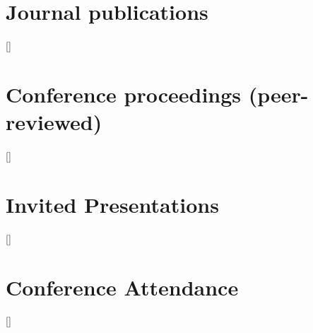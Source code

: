 

\section*{Journal publications}

\begin{refsection}
[\refname]{}
\nocite{
TeixeiraEncarnacao2016,
Bezdek2016,
Siemes2016,
VandenIJssel2015,
HashemiFarahani2013,
Olsen2013a,
Visser2013,
Ditmar2012,
Gunter2011,
Encarnacao2008a,
Resendes2007}
\togglefalse{bbx:url}
\printbibliography
\end{refsection}


\section*{Conference proceedings (peer-reviewed)}

\begin{refsection}
[\refname]{}

\nocite{
Gunter2012a,
Gunter2010,
Gunter2009,
Encarnacao2008,
Resendes2006,
Resendes2005}
\printbibliography
\end{refsection}


\section*{Invited Presentations}

\begin{refsection}
[\refname]{}
\nocite{
TeixeiraEncarnacao2015a,
Encarnacao2017}
\printbibliography
\end{refsection}


\section*{Conference Attendance}

\begin{refsection}
[\refname]{}
\nocite{
Encarnacao2002,
Encarnacao2008,
TeixeiraEncarnacao2008,
TeixeiraEncarnacao2007,
TeixeiraEncarnacao2007a,
TeixeiraEncarnacao2014,
TeixeiraEncarnacao2014a,
TeixeiraEncarnacao2014b,
Encarnacao2015,
TeixeiraEncarnacao2015b,
TeixeiraEncarnacao2016a,
TeixeiraEncarnacao2016b,
TeixeiraEncarnacao2017a,
TeixeiraEncarnacao2017}
\printbibliography
\end{refsection}

